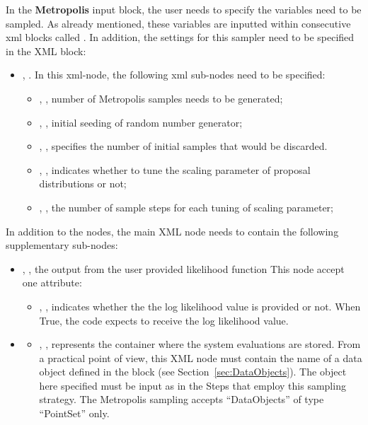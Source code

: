 In the \textbf{Metropolis} input block, the user needs to specify the variables need to be sampled.
As already mentioned, these variables are inputted within consecutive xml blocks called .
In addition, the settings for this sampler need to be specified in the  XML block:
\begin{itemize}
  \item {},  . In this xml-node, the following xml sub-nodes need to be specified:
  \begin{itemize}
    \item {},  , number of Metropolis samples needs to be generated;
    \item {}, , initial seeding of random number generator;
    \item {}, , specifies the number of initial samples that would be discarded.
    \item {}, , indicates whether to tune the scaling parameter of proposal distributions or not;
    \item {}, , the number of sample steps for each tuning of scaling parameter;
  \end{itemize}
\end{itemize}

In addition to the  nodes, the main XML node
 needs to contain the following supplementary sub-nodes:

\begin{itemize}
  \item {}, , the output from the user provided likelihood function
  This node accept one attribute:
  \begin{itemize}
    \item {}, , indicates whether the the log likelihood value is
    provided or not. When True, the code expects to receive the log likelihood value.
  \end{itemize}
  \item {}
  \begin{itemize}
    \item {}, ,
      represents the container where the system evaluations are stored.
      From a practical point of view, this XML node must contain the name of
      a data object defined in the  block (see
      Section~\ref{sec:DataObjects}). The object here specified must be
      input as   in the Steps that employ this sampling strategy.
      The Metropolis sampling accepts ``DataObjects'' of type
      ``PointSet'' only.
  \end{itemize}
\end{itemize}


